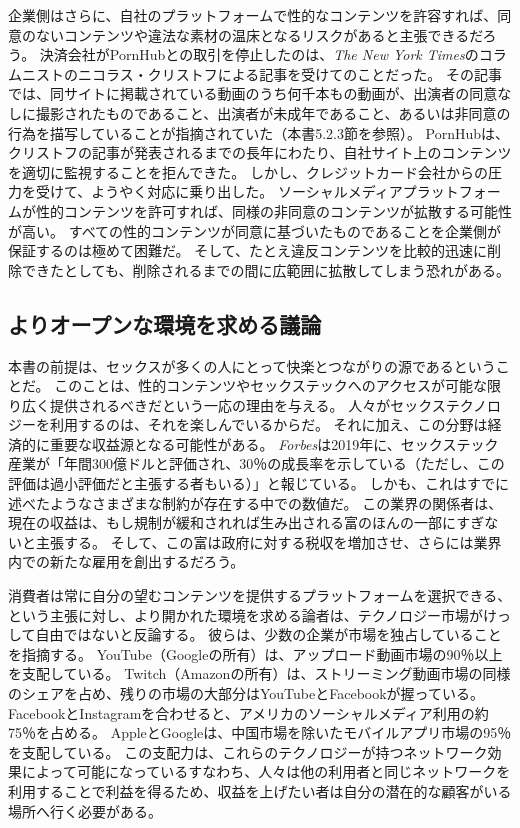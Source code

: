 \documentclass[paper=a4,book,openany]{jlreq} \usepackage{mystyle}
\begin{document}
企業側はさらに、自社のプラットフォームで性的なコンテンツを許容すれば、同意のないコンテンツや違法な素材の温床となるリスクがあると主張できるだろう。
決済会社がPornHubとの取引を停止したのは、\emph{The New York Times}のコラムニストのニコラス・クリストフによる記事を受けてのことだった。
その記事では、同サイトに掲載されている動画のうち何千本もの動画が、出演者の同意なしに撮影されたものであること、出演者が未成年であること、あるいは非同意の行為を描写していることが指摘されていた（本書5.2.3節を参照）。
PornHubは、クリストフの記事が発表されるまでの長年にわたり、自社サイト上のコンテンツを適切に監視することを拒んできた。
しかし、クレジットカード会社からの圧力を受けて、ようやく対応に乗り出した。
ソーシャルメディアプラットフォームが性的コンテンツを許可すれば、同様の非同意のコンテンツが拡散する可能性が高い。
すべての性的コンテンツが同意に基づいたものであることを企業側が保証するのは極めて困難だ。
そして、たとえ違反コンテンツを比較的迅速に削除できたとしても、削除されるまでの間に広範囲に拡散してしまう恐れがある。

\subsection{よりオープンな環境を求める議論}

本書の前提は、セックスが多くの人にとって快楽とつながりの源であるということだ。
このことは、性的コンテンツやセックステックへのアクセスが可能な限り広く提供されるべきだという一応の理由を与える。
人々がセックステクノロジーを利用するのは、それを楽しんでいるからだ。
それに加え、この分野は経済的に重要な収益源となる可能性がある。
\emph{Forbes}は2019年に、セックステック産業が「年間300億ドルと評価され、30％の成長率を示している（ただし、この評価は過小評価だと主張する者もいる）」と報じている\citep{jaramillo19:_inves_sextec}。
しかも、これはすでに述べたようなさまざまな制約が存在する中での数値だ。
この業界の関係者は、現在の収益は、もし規制が緩和されれば生み出される富のほんの一部にすぎないと主張する。
そして、この富は政府に対する税収を増加させ、さらには業界内での新たな雇用を創出するだろう。

消費者は常に自分の望むコンテンツを提供するプラットフォームを選択できる、という主張に対し、より開かれた環境を求める論者は、テクノロジー市場がけっして自由ではないと反論する。
彼らは、少数の企業が市場を独占していることを指摘する。
YouTube（Googleの所有）は、アップロード動画市場の90％以上を支配している。
Twitch（Amazonの所有）は、ストリーミング動画市場の同様のシェアを占め、残りの市場の大部分はYouTubeとFacebookが握っている。
FacebookとInstagramを合わせると、アメリカのソーシャルメディア利用の約75％を占める\citep{department21:_us_market}。
AppleとGoogleは、中国市場を除いたモバイルアプリ市場の95％を支配している\citep{curry21:_app_store_data}。
この支配力は、これらのテクノロジーが持つネットワーク効果によって可能になっている{\DDASH}すなわち、人々は他の利用者と同じネットワークを利用することで利益を得るため、収益を上げたい者は自分の潜在的な顧客がいる場所へ行く必要がある。
\end{document}
